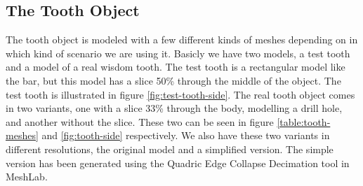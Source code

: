 \layoutnewpage

\subsection{The Tooth Object}
\label{sec:test-data-tooth}
The tooth object is modeled with a few different kinds of meshes
depending on in which kind of scenario we are using it. Basicly we
have two models, a test tooth and a model of a real wisdom tooth. The test
tooth is a rectangular model like the bar, but this model has a slice
50\% through the middle of the object. The test tooth is illustrated
in figure \vref{fig:test-tooth-side}. The real tooth object comes in
two variants, one with a slice 33\% through the body, modelling a
drill hole, and another without the slice. These two can be seen in
figure \ref{table:tooth-meshes} and \vref{fig:tooth-side}
respectively. We also have these two variants in different
resolutions, the original model and a simplified version. The simple
version has been generated using the Quadric Edge Collapse Decimation
tool in MeshLab.

